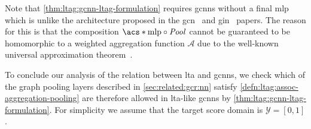 Note that \cref{thm:ltag:gcnn-ltag-formulation} requires \acp{gcnn} without a final \ac{mlp} which is unlike the architecture proposed in the \ac{gcn}~\cite{Kipf2017} and \ac{gin}~\cite{Xu2018} papers.
The reason for this is that the composition $\mathrm{\acs*{mlp}} \circ \mathit{Pool}$ cannot be guaranteed to be homomorphic to a weighted aggregation function $\mathcal{A}$ due to the well-known universal approximation theorem~\cite{Hornik1991}.

To conclude our analysis of the relation between \ac{lta} and \acp{gcnn}, we check which of the graph pooling layers described in \cref{sec:related:gcr:nn} satisfy \cref{defn:ltag:assoc-aggregation-pooling} are therefore allowed in \acs{lta}-like \acp{gcnn} by \cref{thm:ltag:gcnn-ltag-formulation}.
For simplicity we assume that the target score domain is $\mathcal{Y} = [0, 1]$.
